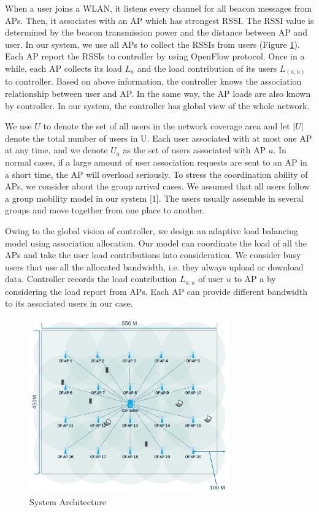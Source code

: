 When a user joins a WLAN, it listens every channel for all beacon messages from APs. Then, it associates with an AP which has strongest RSSI. The RSSI value is determined by the beacon transmission power and the distance between AP and user. In our system, we use all APs to collect the RSSIs from users  (Figure \ref{fig:scheme1}). Each AP report the RSSIs to controller by using OpenFlow protocol. Once in a while, each AP collects its load $L_a$  and the load contribution of its users $L_(a,u)$  to controller. Based on above information, the controller knows the association relationship between user and AP. In the same way, the AP loads are also known by controller. In our system, the controller has global view of the whole network.

We use $U$ to denote the set of all users in the network coverage area and let $|U|$ denote the total number of users in U. Each user associated with at most one AP at any time, and we denote $U_a$ as the set of users associated with AP $a$. In normal cases, if a large amount of user association requests are sent to an AP in a short time, the AP will overload seriously. To stress the coordination ability of APs, we consider about the group arrival cases. We assumed that all users follow a group mobility model in our system [1]. The users usually assemble in several groups and move together from one place to another.

Owing to the global vision of controller, we design an adaptive load balancing model using association allocation. Our model can coordinate the load of all the APs and take the user load contributions into consideration. We consider busy users that use all the allocated bandwidth, i.e. they always upload or download data. Controller records the load contribution $L_{a,u}$ of user $u$ to AP a by considering the load report from APs. Each AP can provide different bandwidth to its associated users in our case.


\begin{figure}[tbp]
\begin{center}
\includegraphics[width=3.4in]{images/scheme1.pdf}
\end{center}
\caption{System Architecture}
\label{fig:scheme1}
\end{figure}

